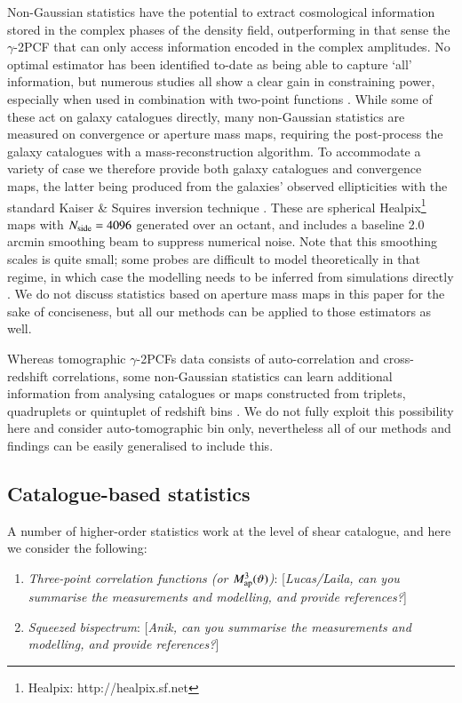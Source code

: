 \documentclass[useAMS,usenatbib]{mn2e}
\begin{document}
Non-Gaussian statistics have the potential to extract cosmological information stored in the complex phases of the density field, outperforming in that sense the $\gamma$-2PCF that can only access information encoded in the complex amplitudes. No optimal estimator has been identified to-date as being able to capture `all' information, but numerous studies all show a clear gain in constraining power, especially when used in combination with two-point functions \citep{HD21, DESY3_Zurcher, HSC_PeaksSims}. While some of these act on galaxy catalogues directly, many non-Gaussian statistics are measured on convergence or aperture mass maps, requiring the post-process the galaxy catalogues with a mass-reconstruction algorithm. To accommodate a variety of case we therefore provide both galaxy catalogues and convergence maps, the latter being  produced from the galaxies' observed ellipticities with  the standard Kaiser \& Squires inversion technique \citep{KaiserSquires}. These are spherical {\sc Healpix}\footnote{{\sc Healpix}: http://healpix.sf.net}  maps \citep{healpix} with $N_{\rm side}=4096$ generated over an octant,  and includes a baseline 2.0 arcmin smoothing beam to suppress numerical noise. Note that this smoothing scales is quite small; some probes are difficult to model theoretically in that regime, in which case the modelling needs to be inferred from simulations directly \citep[as in][]{HD21, DESY3_Zuercher, HSCY1_Peaks_sims}. We do not discuss statistics based on aperture mass maps in this paper for the sake of conciseness, but all our methods can be applied to those estimators as well.
 
Whereas tomographic $\gamma$-2PCFs data consists of auto-correlation and cross-redshift correlations, some non-Gaussian statistics can learn additional information from analysing catalogues or maps constructed from triplets, quadruplets or quintuplet of redshift bins \citep{Martinet21a}.  We do not fully exploit this possibility here and consider auto-tomographic bin only, nevertheless all of our methods and findings can be easily generalised to include this. 
 
 
 
\subsection{Catalogue-based statistics}

A number of higher-order statistics work at the level of shear catalogue,  and here we consider the following:
\begin{enumerate}
\item {\it Three-point correlation functions (or $M_{\rm ap}^3(\vartheta)$)}:  [{\it Lucas/Laila, can you summarise the measurements and modelling, and provide references?}]
\item {\it Squeezed bispectrum}: [{\it Anik, can you summarise the measurements and modelling, and provide references?}]
\end{enumerate}
\end{document}
